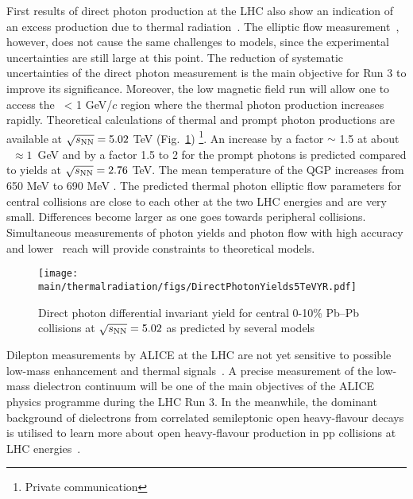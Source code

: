 \documentclass[../report.tex]{subfiles}
\providecommand{\main}{..}
\begin{document}
First results of direct photon production at the LHC also show an indication of an excess production due to thermal radiation~\cite{Adam:2015lda}. The elliptic flow measurement~\cite{Acharya:2018bdy}, however, does not cause the same challenges to models, since the experimental uncertainties are still large at this point.
The reduction of systematic uncertainties of the direct photon measurement is the main objective for Run 3 to improve its significance. Moreover, the low magnetic field run will allow one to access the \pT \ < 1 GeV/$c$ region where the thermal photon production increases rapidly. Theoretical calculations of thermal and prompt photon productions are available at $\sqrt{s_{\rm NN}} = 5.02$ TeV (Fig.~\ref{fig:LHCExpectations_RealPhotons}) \cite{Paquet:2015lta,Paquet:2016ime,Paquet:2017wji,Dasgupta:2018pjm,vanHees:2014ida} \footnote{Private communication}. An increase by a factor $\sim$ 1.5 at about \pT~$\approx 1$~GeV and by a factor 1.5 to 2 for the prompt photons is predicted compared to yields at $\sqrt{s_{\rm NN}} = 2.76$ TeV. The mean temperature of the QGP increases from 650 MeV to 690 MeV \cite{Dasgupta:2018pjm}. The predicted thermal photon elliptic flow parameters for central collisions are close to each other at the two LHC energies  and are very small. Differences become larger as one goes towards peripheral collisions. Simultaneous measurements of photon yields and photon flow with high accuracy and lower \pT \ reach will provide constraints to theoretical models.
\begin{figure}[htb]
\centering
\texttt{[image: \\main/thermalradiation/figs/DirectPhotonYields5TeVYR.pdf]}
\caption{Direct photon differential invariant yield for central 0-10\% Pb--Pb collisions at $\sqrt{s_{\rm NN}} = 5.02$ as predicted by several models \cite{Paquet:2015lta,Paquet:2016ime,Paquet:2017wji,Dasgupta:2018pjm,vanHees:2014ida}}
\label{fig:LHCExpectations_RealPhotons}
\end{figure}


Dilepton measurements by ALICE at the LHC are not yet sensitive to possible low-mass enhancement and thermal signals~\cite{Acharya:2018nxm}. A precise measurement of the low-mass dielectron continuum will be one of the main objectives of the ALICE physics programme during the LHC Run 3. In the meanwhile, the dominant background of dielectrons from correlated semileptonic open heavy-flavour decays is utilised to learn more about open heavy-flavour production in pp collisions at LHC energies~\cite{Acharya:2018ohw,Acharya:2018kkj}.
\end{document}
